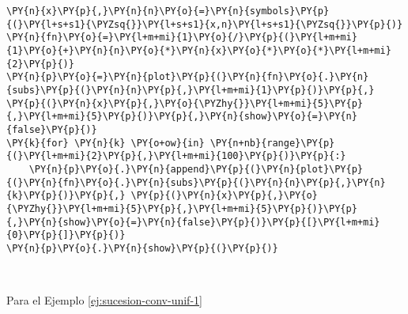     \begin{tcolorbox}[breakable, size=fbox, boxrule=1pt, pad at break*=1mm,colback=cellbackground, colframe=cellborder]
\begin{Verbatim}[commandchars=\\\{\}]
\PY{n}{x}\PY{p}{,}\PY{n}{n}\PY{o}{=}\PY{n}{symbols}\PY{p}{(}\PY{l+s+s1}{\PYZsq{}}\PY{l+s+s1}{x,n}\PY{l+s+s1}{\PYZsq{}}\PY{p}{)}
\PY{n}{fn}\PY{o}{=}\PY{l+m+mi}{1}\PY{o}{/}\PY{p}{(}\PY{l+m+mi}{1}\PY{o}{+}\PY{n}{n}\PY{o}{*}\PY{n}{x}\PY{o}{*}\PY{o}{*}\PY{l+m+mi}{2}\PY{p}{)}
\PY{n}{p}\PY{o}{=}\PY{n}{plot}\PY{p}{(}\PY{n}{fn}\PY{o}{.}\PY{n}{subs}\PY{p}{(}\PY{n}{n}\PY{p}{,}\PY{l+m+mi}{1}\PY{p}{)}\PY{p}{,} \PY{p}{(}\PY{n}{x}\PY{p}{,}\PY{o}{\PYZhy{}}\PY{l+m+mi}{5}\PY{p}{,}\PY{l+m+mi}{5}\PY{p}{)}\PY{p}{,}\PY{n}{show}\PY{o}{=}\PY{n}{false}\PY{p}{)}
\PY{k}{for} \PY{n}{k} \PY{o+ow}{in} \PY{n+nb}{range}\PY{p}{(}\PY{l+m+mi}{2}\PY{p}{,}\PY{l+m+mi}{100}\PY{p}{)}\PY{p}{:}
    \PY{n}{p}\PY{o}{.}\PY{n}{append}\PY{p}{(}\PY{n}{plot}\PY{p}{(}\PY{n}{fn}\PY{o}{.}\PY{n}{subs}\PY{p}{(}\PY{n}{n}\PY{p}{,}\PY{n}{k}\PY{p}{)}\PY{p}{,} \PY{p}{(}\PY{n}{x}\PY{p}{,}\PY{o}{\PYZhy{}}\PY{l+m+mi}{5}\PY{p}{,}\PY{l+m+mi}{5}\PY{p}{)}\PY{p}{,}\PY{n}{show}\PY{o}{=}\PY{n}{false}\PY{p}{)}\PY{p}{[}\PY{l+m+mi}{0}\PY{p}{]}\PY{p}{)}
\PY{n}{p}\PY{o}{.}\PY{n}{show}\PY{p}{(}\PY{p}{)}
\end{Verbatim}
\end{tcolorbox}

    \begin{center}
    \end{center}
    { \hspace*{\fill} \\}

Para el Ejemplo \ref{ej:sucesion-conv-unif-1}



